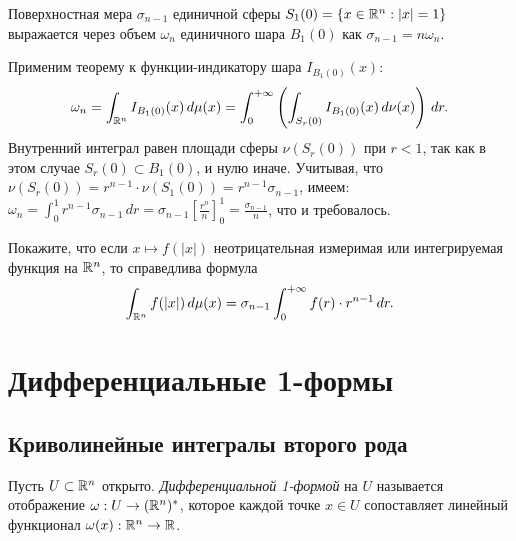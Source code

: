 \begin{corollary}
	Поверхностная мера $\sigma_{n-1}$ единичной сферы $S_1(0) = \{x \in \mathbb{R}^n : |x| = 1\}$ выражается через объем $\omega_n$ единичного шара $B_1(0)$ как $\sigma_{n-1} = n \omega_n$.
\end{corollary}

\begin{myproof}
	Применим теорему к функции-индикатору шара $I_{B_1(0)}(x)$:
	\[ \omega_n = \int_{\mathbb{R}^n} I_{B_1(0)}(x) \, d\mu(x) = \int_{0}^{+\infty} \left( \int_{S_r(0)} I_{B_1(0)}(x) \, d\nu(x) \right) \, dr. \]
	Внутренний интеграл равен площади сферы $\nu(S_r(0))$ при $r < 1$, так как в этом случае $S_r(0) \subset B_1(0)$, и нулю иначе.
	Учитывая, что $\nu(S_r(0)) = r^{n-1} \cdot \nu(S_1(0)) = r^{n-1} \sigma_{n-1}$, имеем:
	$\omega_n = \int_{0}^{1} r^{n-1} \sigma_{n-1} \, dr = \sigma_{n-1} \left[ \frac{r^n}{n} \right]_0^1 = \frac{\sigma_{n-1}}{n}$, что и требовалось. 
\end{myproof}

\begin{problem}
	Покажите, что если $x \mapsto f(|x|)$ неотрицательная измеримая или интегрируемая функция на $\mathbb{R}^n$, то справедлива формула 
	\[ \int_{\mathbb{R}^n} f(|x|) \, d\mu(x) = \sigma_{n-1} \int_{0}^{+\infty} f(r) \cdot r^{n-1} \, dr. \]
\end{problem}

\section{Дифференциальные 1-формы}

\subsection{Криволинейные интегралы второго рода}

\begin{definition}
	Пусть $U \subset \mathbb{R}^n$ открыто. \textit{Дифференциальной 1-формой} на $U$ называется отображение $\omega : U \to (\mathbb{R}^n)^*$, которое каждой точке $x \in U$ сопоставляет линейный функционал $\omega(x) : \mathbb{R}^n \to \mathbb{R}$.
\end{definition}


